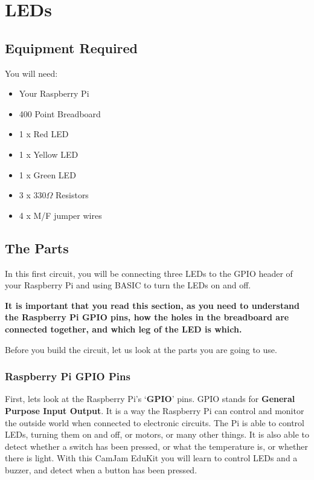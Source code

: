 \section{LEDs}\label{s:leds}


\subsection*{Equipment Required}

You will need:
\begin{itemize}
\item Your Raspberry Pi
\item 400 Point Breadboard
\item 1 x Red LED
\item 1 x Yellow LED
\item 1 x Green LED
\item 3 x 330$\Omega$ Resistors
\item 4 x M/F jumper wires
\end{itemize}

\subsection*{The Parts}

In this first circuit, you will be connecting three LEDs to the GPIO header of your Raspberry Pi and using BASIC to turn the LEDs on and off.

\textbf{It is important that you read this section, as you need to understand the Raspberry Pi GPIO pins, how the holes in the breadboard are connected together, and which leg of the LED is which.}

Before you build the circuit, let us look at the parts you are going to use.

\subsubsection*{Raspberry Pi GPIO Pins}


First, lets look at the Raspberry Pi's `\textbf{GPIO}' pins.  GPIO stands for \textbf{General Purpose Input Output}.  It is a way the Raspberry Pi can control and monitor the outside world when connected to electronic circuits.  The Pi is able to control LEDs, turning them on and off, or motors, or many other things.  It is also able to detect whether a switch has been pressed, or what the temperature is, or whether there is light.  With this CamJam EduKit you will learn to control LEDs and a buzzer, and detect when a button has been pressed.

